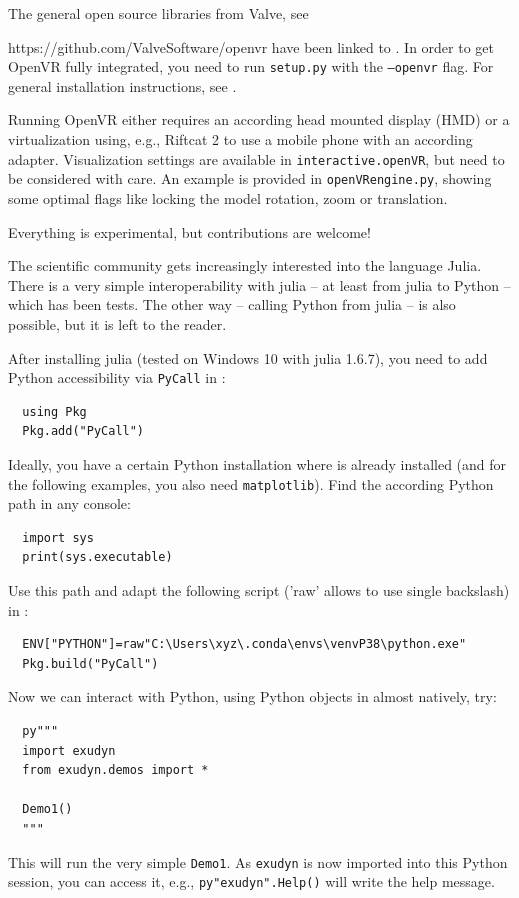 %
The general open source libraries from Valve, see
\bi
\item[] https://github.com/ValveSoftware/openvr
\ei
have been linked to \codeName. In order to get OpenVR fully integrated, you need to run \texttt{setup.py} \codeName with the \texttt{--openvr} flag. For general installation instructions, see .

Running OpenVR either requires an according head mounted display (HMD) or a virtualization using, e.g., Riftcat 2 to use a mobile phone with an according adapter. Visualization settings are available in \texttt{interactive.openVR}, but need to be considered with care.
An example is provided in \texttt{openVRengine.py}, showing some optimal flags like locking the model rotation, zoom or translation.

Everything is experimental, but contributions are welcome!

The scientific community gets increasingly interested into the language Julia.
There is a very simple interoperability with julia -- at least from julia to Python -- which has been tests.
The other way -- calling Python from julia -- is also possible, but it is left to the reader.

After installing julia (tested on Windows 10 with julia 1.6.7), you need to add Python accessibility via \texttt{PyCall}
in :
\begin{lstlisting}
  using Pkg
  Pkg.add("PyCall")
\end{lstlisting}
%
Ideally, you have a certain Python installation where \codeName is already installed (and for the following examples, you also need \texttt{matplotlib}). Find the according Python path in any  console:
\pythonstyle\begin{lstlisting}
  import sys
  print(sys.executable)
\end{lstlisting}
%
Use this path and adapt the following  script ('raw' allows to use single backslash) in :
\begin{lstlisting}
  ENV["PYTHON"]=raw"C:\Users\xyz\.conda\envs\venvP38\python.exe"
  Pkg.build("PyCall")
\end{lstlisting}
%
Now we can interact with Python, using Python objects in  almost natively, try:
\begin{lstlisting}
  py"""
  import exudyn
  from exudyn.demos import *

  Demo1()
  """
\end{lstlisting}
This will run the very simple \codeName \texttt{Demo1}.
As \texttt{exudyn} is now imported into this Python session, you can access it, e.g., \texttt{py"exudyn".Help()} 
will write the help message.

